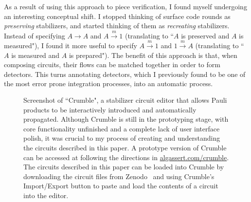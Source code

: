 \documentclass[onecolumn,unpublished,a4paper]{quantumarticle}
\theoremstyle{definition}
\theoremstyle{definition}
\theoremstyle{definition}
\begin{document}
As a result of using this approach to piece verification, I found myself undergoing an interesting conceptual shift.
I stopped thinking of surface code rounds as \emph{preserving} stabilizers, and started thinking of them as \emph{recreating} stabilizers.
Instead of specifying $A \rightarrow A$ and $A \xrightarrow{m} 1$ (translating to ``$A$ is preserved and $A$ is measured"), I found it more useful to specify $A \xrightarrow{m} 1$ and $1 \xrightarrow{m} A$ (translating to ``$A$ is measured and $A$ is prepared").
The benefit of this approach is that, when composing circuits, their flows can be matched together in order to form detectors.
This turns annotating detectors, which I previously found to be one of the most error prone integration processes, into an automatic process.

\begin{figure}
    \centering
    \caption{
        Screenshot of ``Crumble", a stabilizer circuit editor that allows Pauli products to be interactively introduced and automatically propagated.
        Although Crumble is still in the prototyping stage, with core functionality unfinished and a complete lack of user interface polish, it was crucial to my process of creating and understanding the circuits described in this paper.
        A prototype version of Crumble can be accessed at following the directions in \href{https://algassert.com/crumble}{algassert.com/crumble}.
        The circuits described in this paper can be loaded into Crumble by downloading the circuit files from Zenodo~\cite{gidneyybasisdata2022} and using Crumble's Import/Export button to paste and load the contents of a circuit into the editor.
    }
    \label{fig:crumble}
\end{figure}
\end{document}
